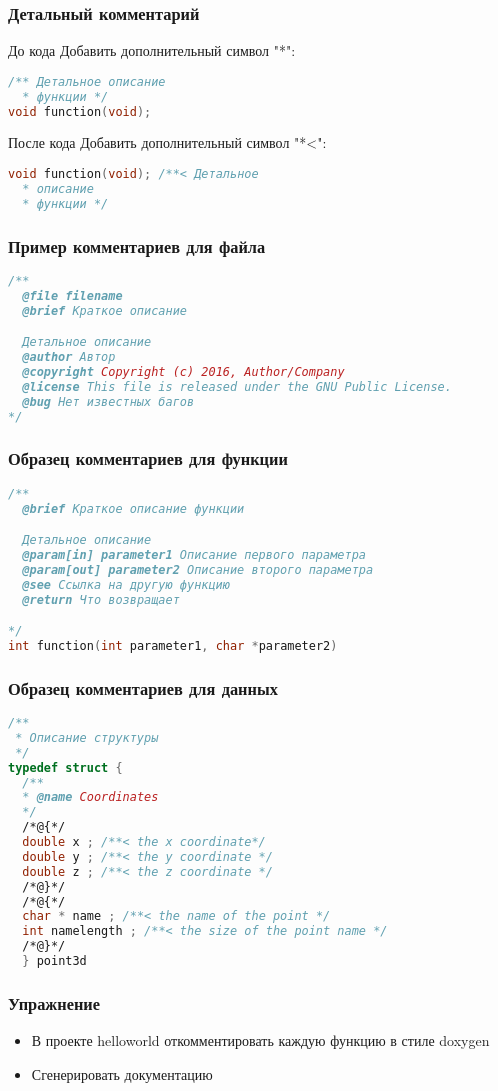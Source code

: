 \begin{frame}[fragile]
 \frametitle{Детальный комментарий}
 \begin{block}{До кода}
   Добавить дополнительный символ "*":
   \begin{lstlisting}[language=C]
/** Детальное описание
  * функции */
void function(void);
\end{lstlisting}
 \end{block}
 \begin{block}{После кода}
   Добавить дополнительный символ "*<":
    \begin{lstlisting}[language=C]
void function(void); /**< Детальное 
  * описание
  * функции */
\end{lstlisting}
 \end{block}
\end{frame}

\begin{frame}[fragile]
 \frametitle{Пример комментариев для файла}
\begin{lstlisting}[language=C]
/**
  @file filename
  @brief Краткое описание

  Детальное описание
  @author Автор
  @copyright Copyright (c) 2016, Author/Company
  @license This file is released under the GNU Public License.
  @bug Нет известных багов
*/
\end{lstlisting}
\end{frame}

\begin{frame}[fragile]
 \frametitle{Образец комментариев для функции}
\begin{lstlisting}[language=C]
/**
  @brief Краткое описание функции

  Детальное описание
  @param[in] parameter1 Описание первого параметра
  @param[out] parameter2 Описание второго параметра
  @see Ссылка на другую функцию
  @return Что возвращает

*/
int function(int parameter1, char *parameter2) 
\end{lstlisting}
\end{frame}

\begin{frame}[fragile]
 \frametitle{Образец комментариев для данных}
\begin{lstlisting}[language=C]
/** 
 * Описание структуры 
 */
typedef struct { 
  /** 
  * @name Coordinates
  */
  /*@{*/
  double x ; /**< the x coordinate*/ 
  double y ; /**< the y coordinate */
  double z ; /**< the z coordinate */
  /*@}*/
  /*@{*/
  char * name ; /**< the name of the point */
  int namelength ; /**< the size of the point name */
  /*@}*/
  } point3d
\end{lstlisting}
\end{frame}


\begin{frame}
 \frametitle{Упражнение}
  \begin{itemize}
    \item В проекте helloworld откомментировать каждую функцию в стиле doxygen
    \item Сгенерировать документацию
  \end{itemize}
\end{frame} 
